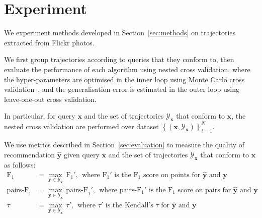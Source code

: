 \section{Experiment}
\label{sec:experiment}

We experiment methods developed in Section~\ref{sec:methods} on trajectories extracted from Flickr photos.

We first group trajectories according to queries that they conform to,
then evaluate the performance of each algorithm using nested cross validation,
where the hyper-parameters are optimised in the inner loop using Monte Carlo cross validation~\cite{burman1989comparative},
and the generalisation error is estimated in the outer loop using leave-one-out cross validation.

In particular, for query $\mathbf{x}$ and the set of trajectories $\mathcal{Y}_\mathbf{x}$ that conform to $\mathbf{x}$,
the nested cross validation are performed over dataset $\left\{(\mathbf{x}, \mathcal{Y}_\mathbf{x})\right\}_{i=1}^N$.

We use metrics described in Section~\ref{sec:evaluation} to measure the quality of recommendation $\hat{\mathbf{y}}$ given
query $\mathbf{x}$ and the set of trajectories $\mathcal{Y}_\mathbf{x}$ that conform to $\mathbf{x}$ as follows:
\begin{align*}
\text{F}_1 &= \max_{\mathbf{y} \in \mathcal{Y}_\mathbf{x}} \, \text{F}_1', ~~
\text{where F$_1'$ is the F$_1$ score on points for $\hat{\mathbf{y}}$ and $\mathbf{y}$} \\
\text{pairs-F}_1 &= \max_{\mathbf{y} \in \mathcal{Y}_\mathbf{x}} \, \text{pairs-F}_1', ~~
\text{where pairs-F$_1'$ is the F$_1$ score on pairs for $\hat{\mathbf{y}}$ and $\mathbf{y}$} \\
\tau &= \max_{\mathbf{y} \in \mathcal{Y}_\mathbf{x}} \, \tau', ~~
\text{where $\tau'$ is the Kendall's $\tau$ for $\hat{\mathbf{y}}$ and $\mathbf{y}$}
\end{align*}
